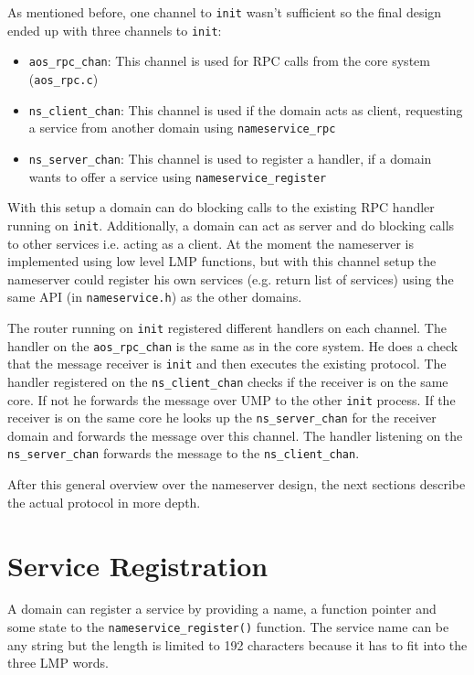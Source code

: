 As mentioned before, one channel to \verb|init| wasn't sufficient so the final design ended up with three channels to \verb|init|:

\begin{itemize}
    \item \verb|aos_rpc_chan|: This channel is used for RPC calls from the core system (\verb|aos_rpc.c|)
    \item \verb|ns_client_chan|: This channel is used if the domain acts as client, requesting a service from another domain using 
        \verb|nameservice_rpc|
    \item \verb|ns_server_chan|: This channel is used to register a handler, if a domain wants to offer a service using 
        \verb|nameservice_register|
\end{itemize}

With this setup a domain can do blocking calls to the existing RPC handler running on \verb|init|. Additionally, a domain can act
as server and do blocking calls to other services i.e. acting as a client. At the moment the nameserver is implemented using low 
level LMP functions, but with this channel setup the nameserver could register his own services (e.g. return list of services)
using the same API (in \verb|nameservice.h|) as the other domains.

The router running on \verb|init| registered different handlers on each channel. The handler on the \verb|aos_rpc_chan| is the
same as in the core system. He does a check that the message receiver is \verb|init| and then executes the existing protocol.
The handler registered on the \verb|ns_client_chan| checks if the receiver is on the same core. If not he forwards the message
over UMP to the other \verb|init| process. If the receiver is on the same core he looks up the \verb|ns_server_chan| for the
receiver domain and forwards the message over this channel. The handler listening on the \verb|ns_server_chan| forwards the
message to the \verb|ns_client_chan|.

After this general overview over the nameserver design, the next sections describe the actual protocol in more depth.

\section{Service Registration}

A domain can register a service by providing a name, a function pointer and some state to the \verb|nameservice_register()| function.
The service name can be any string but the length is limited to 192 characters because it has to fit into the three LMP words.

